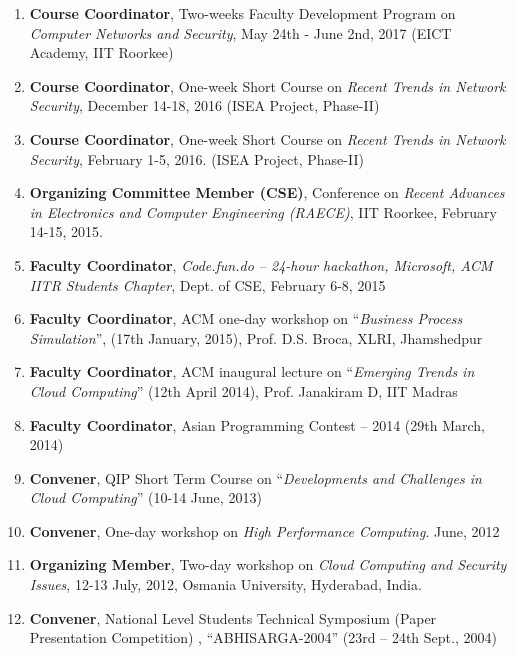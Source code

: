 \begin{enumerate}
\item
\textbf{Course Coordinator}, Two-weeks Faculty Development Program on \textit{Computer Networks and Security}, May 24th - June 2nd, 2017 (EICT Academy, IIT Roorkee)

\item
\textbf{Course Coordinator}, One-week Short Course on \textit{Recent Trends in Network Security}, December 14-18, 2016 (ISEA Project, Phase-II)

\item
\textbf{Course Coordinator}, One-week Short Course on \textit{Recent Trends in Network Security}, February 1-5, 2016. (ISEA Project, Phase-II)

\item
\textbf{Organizing Committee Member (CSE)}, Conference on \textit{Recent Advances in Electronics and Computer Engineering (RAECE)}, IIT Roorkee, February 14-15, 2015.

\item
\textbf{Faculty Coordinator}, \textit{Code.fun.do – 24-hour hackathon, Microsoft, ACM IITR Students Chapter}, Dept. of CSE, February 6-8, 2015

\item
\textbf{Faculty Coordinator}, ACM one-day workshop on “\textit{Business Process Simulation}”, (17th January, 2015), Prof. D.S. Broca, XLRI, Jhamshedpur

\item
\textbf{Faculty Coordinator}, ACM inaugural lecture on “\textit{Emerging Trends in Cloud Computing}” (12th April 2014), Prof. Janakiram D, IIT Madras 

\item
\textbf{Faculty Coordinator}, Asian Programming Contest – 2014 (29th March, 2014)

\item
\textbf{Convener}, QIP Short Term Course on “\textit{Developments and Challenges in Cloud Computing}” (10-14 June, 2013)

\item
\textbf{Convener}, One-day workshop on\textit{ High Performance Computing}. June, 2012

\item
\textbf{Organizing Member}, Two-day workshop on\textit{ Cloud Computing and Security Issues}, 12-13 July, 2012, Osmania University, Hyderabad, India.

\item
\textbf{Convener}, National Level Students Technical Symposium (Paper Presentation Competition) , “ABHISARGA-2004” (23rd – 24th Sept., 2004) 


\end{enumerate}
